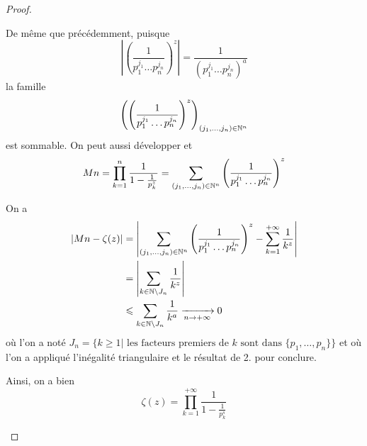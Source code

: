 \documentclass[12pt]{article}
\begin{document}
\begin{proof}
\begin{enumerate}
		De même que précédemment, puisque 
		\begin{equation*}\left\vert\left(\frac{1}{p_{1}^{j_{1}}\dots p_{n}^{j_{n}}}\right)^{z}\right\vert=\frac{1}{\left(p_{1}^{j_{1}}\dots p_{n}^{j_{n}}\right)^{a}}\end{equation*}
		la famille 
		\begin{equation*}\left(\left(\frac{1}{p_{1}^{j_{1}}\dots p_{n}^{j_{n}}}\right)^{z}\right)_{(j_{1},\dots,j_{n})\in\mathbb{N}^{n}}\end{equation*}
		est sommable. On peut aussi développer et 
		\begin{equation*}\Pi_{n}=\prod_{k=1}^{n}\frac{1}{1-\frac{1}{p_{k}^{z}}}=\sum_{(j_{1},\dots,j_{n})\in\N^{n}}\left(\frac{1}{p_{1}^{j_{1}}\dots p_{n}^{j_{n}}}\right)^{z}\end{equation*}
		
		On a 
		\begin{align*}
			\left\vert\Pi_{n}-\zeta(z)\right\vert
			&=\left\vert\sum_{(j_{1},\dots,j_{n})\in\N^{n}}\left(\frac{1}{p_{1}^{j_{1}}\dots p_{n}^{j_{n}}}\right)^{z}-\sum_{k=1}^{+\infty}\frac{1}{k^{z}}\right\vert\\
			&=\left\vert\sum_{k\in\N\setminus J_{n}}\frac{1}{k^{z}}\right\vert\\
			&\leqslant \sum_{k\in\N\setminus J_{n}}\frac{1}{k^{a}}\xrightarrow[n\to+\infty]{}0
		\end{align*}
		où l'on a noté $J_{n}=\{k\geqslant 1|\text{ les facteurs premiers de }k\text{ sont dans }\{p_{1},\dots,p_{n}\}\}$ et où l'on a appliqué l'inégalité triangulaire et le résultat de 2. pour conclure.

		Ainsi, on a bien 
		\begin{equation*}\boxed{\zeta(z)=\prod_{k=1}^{+\infty}\frac{1}{1-\frac{1}{p_{k}^{s}}}}\end{equation*}
	\end{enumerate}
\end{proof}
\end{document}

